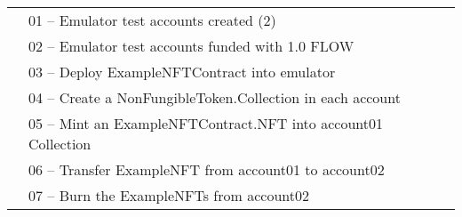\documentclass[../NFTComp_IEEE.tex]{subfiles}
\begin{document}
\begin{table}[ht]
{\begin{tabular}{lllllll}
            \multicolumn{1}{l|}{}                              & \multicolumn{6}{l|}{01 – Emulator test accounts created (2)}                                                                                                                                                                                                                      \\ \cline{2-7}
            \multicolumn{1}{l|}{}                              & \multicolumn{6}{l|}{02 – Emulator test accounts funded with 1.0 FLOW}                                                                                                                                                                                                             \\ \cline{2-7}
            \multicolumn{1}{l|}{}                              & \multicolumn{6}{l|}{03 – Deploy ExampleNFTContract into emulator}                                                                                                                                                                                                                 \\ \cline{2-7}
            \multicolumn{1}{l|}{}                              & \multicolumn{6}{l|}{04 – Create a NonFungibleToken.Collection in each account}                                                                                                                                                                                                    \\ \cline{2-7}
            \multicolumn{1}{l|}{}                              & \multicolumn{6}{l|}{05 – Mint an ExampleNFTContract.NFT into account01 Collection}                                                                                                                                                                                                \\ \cline{2-7}
            \multicolumn{1}{l|}{}                              & \multicolumn{6}{l|}{06 – Transfer ExampleNFT from account01 to account02}                                                                                                                                                                                                         \\ \cline{2-7}
            \multicolumn{1}{l|}{}                              & \multicolumn{6}{l|}{07 – Burn the ExampleNFTs from account02}                                                                                                                                                                                                                     \\ \cline{2-7}
        \end{tabular}%
    }
\end{table}
\end{document}
